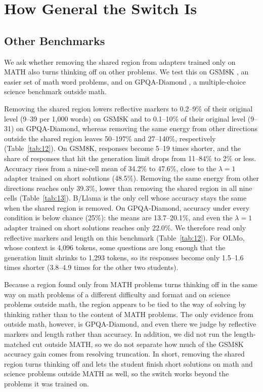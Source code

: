 \section{How General the Switch Is}\label{sec:general}

\subsection{Other Benchmarks}\label{sec:ood}

We ask whether removing the shared region from adapters trained only on MATH also turns thinking off on other problems. We test this on GSM8K \citep{cobbe2021training}, an easier set of math word problems, and on GPQA-Diamond \citep{rein2023gpqa}, a multiple-choice science benchmark outside math.

Removing the shared region lowers reflective markers to 0.2--9\% of their original level (9--39 per 1,000 words) on GSM8K and to 0.1--10\% of their original level (9--31) on GPQA-Diamond, whereas removing the same energy from other directions outside the shared region leaves 50--197\% and 27--140\%, respectively (Table~\ref{tab:12}).
On GSM8K, responses become 5--19 times shorter, and the share of responses that hit the generation limit drops from 11--84\% to 2\% or less. Accuracy rises from a nine-cell mean of 34.2\% to 47.6\%, close to the $\lambda=1$ adapter trained on short solutions (48.5\%). Removing the same energy from other directions reaches only 39.3\%, lower than removing the shared region in all nine cells (Table~\ref{tab:13}). B/Llama is the only cell whose accuracy stays the same when the shared region is removed.
On GPQA-Diamond, accuracy under every condition is below chance (25\%): the means are 13.7--20.1\%, and even the $\lambda=1$ adapter trained on short solutions reaches only 22.0\%. We therefore read only reflective markers and length on this benchmark (Table~\ref{tab:12}). For OLMo, whose context is 4,096 tokens, some questions are long enough that the generation limit shrinks to 1,293 tokens, so its responses become only 1.5--1.6 times shorter (3.8--4.9 times for the other two students).

Because a region found only from MATH problems turns thinking off in the same way on math problems of a different difficulty and format and on science problems outside math, the region appears to be tied to the way of solving by thinking rather than to the content of MATH problems. The only evidence from outside math, however, is GPQA-Diamond, and even there we judge by reflective markers and length rather than accuracy. In addition, we did not run the length-matched cut outside MATH, so we do not separate how much of the GSM8K accuracy gain comes from resolving truncation.
In short, removing the shared region turns thinking off and lets the student finish short solutions on math and science problems outside MATH as well, so the switch works beyond the problems it was trained on.

